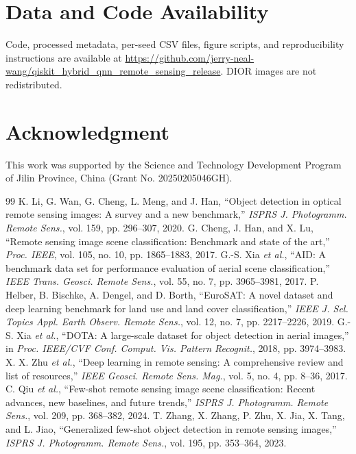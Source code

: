 \documentclass[journal]{IEEEtran}
\begin{document}
\section*{Data and Code Availability}
Code, processed metadata, per-seed CSV files, figure scripts, and reproducibility instructions are available at \url{https://github.com/jerry-neal-wang/qiskit_hybrid_qnn_remote_sensing_release}. DIOR images are not redistributed.

\section*{Acknowledgment}
This work was supported by the Science and Technology Development Program of Jilin Province, China (Grant No. 20250205046GH).

\balance
\begin{thebibliography}{99}
 K. Li, G. Wan, G. Cheng, L. Meng, and J. Han, ``Object detection in optical remote sensing images: A survey and a new benchmark,'' \emph{ISPRS J. Photogramm. Remote Sens.}, vol. 159, pp. 296--307, 2020.
 G. Cheng, J. Han, and X. Lu, ``Remote sensing image scene classification: Benchmark and state of the art,'' \emph{Proc. IEEE}, vol. 105, no. 10, pp. 1865--1883, 2017.
 G.-S. Xia \emph{et al.}, ``AID: A benchmark data set for performance evaluation of aerial scene classification,'' \emph{IEEE Trans. Geosci. Remote Sens.}, vol. 55, no. 7, pp. 3965--3981, 2017.
 P. Helber, B. Bischke, A. Dengel, and D. Borth, ``EuroSAT: A novel dataset and deep learning benchmark for land use and land cover classification,'' \emph{IEEE J. Sel. Topics Appl. Earth Observ. Remote Sens.}, vol. 12, no. 7, pp. 2217--2226, 2019.
 G.-S. Xia \emph{et al.}, ``DOTA: A large-scale dataset for object detection in aerial images,'' in \emph{Proc. IEEE/CVF Conf. Comput. Vis. Pattern Recognit.}, 2018, pp. 3974--3983.
 X. X. Zhu \emph{et al.}, ``Deep learning in remote sensing: A comprehensive review and list of resources,'' \emph{IEEE Geosci. Remote Sens. Mag.}, vol. 5, no. 4, pp. 8--36, 2017.
 C. Qiu \emph{et al.}, ``Few-shot remote sensing image scene classification: Recent advances, new baselines, and future trends,'' \emph{ISPRS J. Photogramm. Remote Sens.}, vol. 209, pp. 368--382, 2024.
 T. Zhang, X. Zhang, P. Zhu, X. Jia, X. Tang, and L. Jiao, ``Generalized few-shot object detection in remote sensing images,'' \emph{ISPRS J. Photogramm. Remote Sens.}, vol. 195, pp. 353--364, 2023.

\end{thebibliography}
\end{document}
